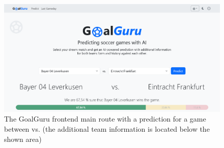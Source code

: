 \documentclass[conference,a4paper,flushend]{cs-techrep}
\begin{document}


\sloppy
\printbibliography[notcategory=selfref]

\clearpage

\begin{figure}
    \centering
    \includegraphics[width=1\textheight]{Screenshot 2024-06-28 at 13-46-20 GoalGuru.png}
    \caption{The GoalGuru frontend main route with a prediction for a game between  vs.  (the additional team information is located below the shown area)}
    \label{fig:goalgurufrontend}
\end{figure}
\end{document}
